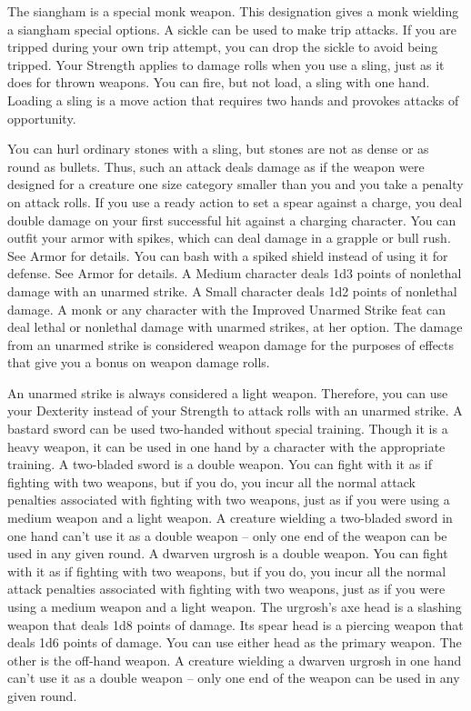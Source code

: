  The siangham is a special monk weapon. This designation gives a monk wielding a siangham special options.
 A sickle can be used to make trip attacks. If you are tripped during your own trip attempt, you can drop the sickle to avoid being tripped.
 Your Strength applies to damage rolls when you use a sling, just as it does for thrown weapons. You can fire, but not load, a sling with one hand. Loading a sling is a move action that requires two hands and provokes attacks of opportunity.
\par You can hurl ordinary stones with a sling, but stones are not as dense or as round as bullets. Thus, such an attack deals damage as if the weapon were designed for a creature one size category smaller than you and you take a  penalty on attack rolls.
 If you use a ready action to set a spear against a charge, you deal double damage on your first successful hit against a charging character.
 You can outfit your armor with spikes, which can deal damage in a grapple or bull rush. See Armor for details.
 You can bash with a spiked shield instead of using it for defense. See Armor for details.
 A Medium character deals 1d3 points of nonlethal damage with an unarmed strike. A Small character deals 1d2 points of nonlethal damage. A monk or any character with the Improved Unarmed Strike feat can deal lethal or nonlethal damage with unarmed strikes, at her option. The damage from an unarmed strike is considered weapon damage for the purposes of effects that give you a bonus on weapon damage rolls.
\par An unarmed strike is always considered a light weapon. Therefore, you can use your Dexterity instead of your Strength to attack rolls with an unarmed strike.
 A bastard sword can be used two-handed without special training. Though it is a heavy weapon, it can be used in one hand by a character with the appropriate training.
 A two-bladed sword is a double weapon. You can fight with it as if fighting with two weapons, but if you do, you incur all the normal attack penalties associated with fighting with two weapons, just as if you were using a medium weapon and a light weapon. A creature wielding a two-bladed sword in one hand can't use it as a double weapon -- only one end of the weapon can be used in any given round.
 A dwarven urgrosh is a double weapon. You can fight with it as if fighting with two weapons, but if you do, you incur all the normal attack penalties associated with fighting with two weapons, just as if you were using a medium weapon and a light weapon. The urgrosh's axe head is a slashing weapon that deals 1d8 points of damage. Its spear head is a piercing weapon that deals 1d6 points of damage. You can use either head as the primary weapon. The other is the off-hand weapon. A creature wielding a dwarven urgrosh in one hand can't use it as a double weapon -- only one end of the weapon can be used in any given round.
